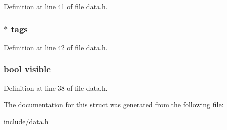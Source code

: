 Definition at line 41 of file data.\+h.

\subsubsection[{\texorpdfstring{tags}{tags}}]{$\ast$ tags}\hypertarget{struct_node_a5b3cb60eeefcbc271683754bf243aebb}{}\label{struct_node_a5b3cb60eeefcbc271683754bf243aebb}


Definition at line 42 of file data.\+h.

\subsubsection[{\texorpdfstring{visible}{visible}}]{\setlength{\rightskip}{0pt plus 5cm}bool visible}\hypertarget{struct_node_aa54a57ae048476d840caf6d4d2c47aa3}{}\label{struct_node_aa54a57ae048476d840caf6d4d2c47aa3}


Definition at line 38 of file data.\+h.



The documentation for this struct was generated from the following file\+:\begin{DoxyCompactItemize}
\item 
include/\hyperlink{data_8h}{data.\+h}\end{DoxyCompactItemize}
